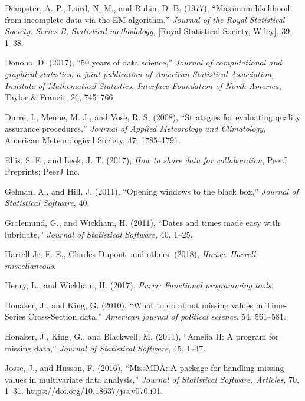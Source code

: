 \documentclass[]{article}
\theoremstyle{definition}
\theoremstyle{definition}
\theoremstyle{definition}
\theoremstyle{remark}
\begin{document}
\leavevmode\hypertarget{ref-Dempster1977}{}%
Dempster, A. P., Laird, N. M., and Rubin, D. B. (1977), ``Maximum
likelihood from incomplete data via the EM algorithm,'' \emph{Journal of
the Royal Statistical Society. Series B, Statistical methodology},
{[}Royal Statistical Society, Wiley{]}, 39, 1--38.

\leavevmode\hypertarget{ref-Donoho2017}{}%
Donoho, D. (2017), ``50 years of data science,'' \emph{Journal of
computational and graphical statistics: a joint publication of American
Statistical Association, Institute of Mathematical Statistics, Interface
Foundation of North America}, Taylor \& Francis, 26, 745--766.

\leavevmode\hypertarget{ref-Durre2008-ghcn}{}%
Durre, I., Menne, M. J., and Vose, R. S. (2008), ``Strategies for
evaluating quality assurance procedures,'' \emph{Journal of Applied
Meteorology and Climatology}, American Meteorological Society, 47,
1785--1791.

\leavevmode\hypertarget{ref-Ellis2017}{}%
Ellis, S. E., and Leek, J. T. (2017), \emph{How to share data for
collaboration}, PeerJ Preprints; PeerJ Inc.

\leavevmode\hypertarget{ref-mi}{}%
Gelman, A., and Hill, J. (2011), ``Opening windows to the black box,''
\emph{Journal of Statistical Software}, 40.

\leavevmode\hypertarget{ref-lubridate}{}%
Grolemund, G., and Wickham, H. (2011), ``Dates and times made easy with
lubridate,'' \emph{Journal of Statistical Software}, 40, 1--25.

\leavevmode\hypertarget{ref-Hmisc}{}%
Harrell Jr, F. E., Charles Dupont, and others. (2018), \emph{Hmisc:
Harrell miscellaneous}.

\leavevmode\hypertarget{ref-purrr}{}%
Henry, L., and Wickham, H. (2017), \emph{Purrr: Functional programming
tools}.

\leavevmode\hypertarget{ref-Honaker2010}{}%
Honaker, J., and King, G. (2010), ``What to do about missing values in
Time-Series Cross-Section data,'' \emph{American journal of political
science}, 54, 561--581.

\leavevmode\hypertarget{ref-amelia}{}%
Honaker, J., King, G., and Blackwell, M. (2011), ``Amelia II: A program
for missing data,'' \emph{Journal of Statistical Software}, 45, 1--47.

\leavevmode\hypertarget{ref-missMDA}{}%
Josse, J., and Husson, F. (2016), ``MissMDA: A package for handling
missing values in multivariate data analysis,'' \emph{Journal of
Statistical Software, Articles}, 70, 1--31.
\url{https://doi.org/10.18637/jss.v070.i01}.
\end{document}
